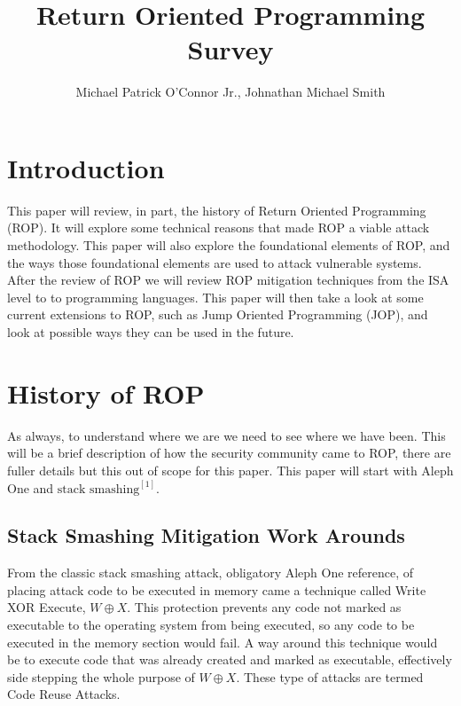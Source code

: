 \documentclass[11pt]{amsart}
\title{Return Oriented Programming Survey}
\author{Michael Patrick O'Connor Jr., Johnathan Michael Smith}
\date{}
\begin{document}
\maketitle

\newpage
\section*{Introduction}
This paper will review, in part, the history of Return Oriented Programming (ROP). It will explore some technical reasons that made ROP a viable attack methodology. This paper will also explore the foundational elements of ROP, and the ways those foundational elements are used to attack vulnerable systems. After the review of ROP we will review ROP mitigation techniques from the ISA level to to programming languages. This paper will then take a look at some current extensions to ROP, such as Jump Oriented Programming (JOP), and look at possible ways they can be used in the future.
\section*{History of ROP}
As always, to understand where we are we need to see where we have been.  This will be a brief description of how the security community came to ROP, there are fuller details but this out of scope for this paper.  This paper will start with Aleph One and $\text{stack smashing}^{[1]}$.
\subsection*{Stack Smashing Mitigation Work Arounds}
From the classic stack smashing attack, obligatory Aleph One reference, of placing attack code to be executed in memory came a technique called Write XOR Execute, $W \oplus X$. This protection prevents any code not marked as executable to the operating system from being executed, so any code to be executed in the memory section would fail. A way around this technique would be to execute code that was already created and marked as executable, effectively side stepping the whole purpose of $W \oplus X$.  These type of attacks are termed Code Reuse Attacks.
\end{document}
